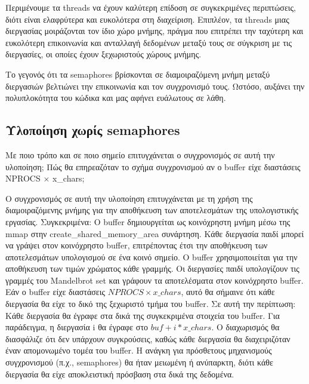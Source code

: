 \documentclass[12pt]{article}
\begin{document}
Περιμένουμε τα threads να έχουν καλύτερη επίδοση σε συγκεκριμένες περιπτώσεις, διότι
είναι ελαφρύτερα και ευκολότερα στη διαχείριση. Επιπλέον, τα threads μιας διεργασίας
μοιράζονται τον ίδιο χώρο μνήμης, πράγμα που επιτρέπει την ταχύτερη και ευκολότερη 
επικοινωνία και ανταλλαγή δεδομένων μεταξύ τους σε σύγκριση με τις διεργασίες, οι 
οποίες έχουν ξεχωριστούς χώρους μνήμης.

Το γεγονός ότι τα semaphores βρίσκονται σε διαμοιραζόμενη μνήμη μεταξύ διεργασιών 
βελτιώνει την επικοινωνία και τον συγχρονισμό τους. 
Ωστόσο, αυξάνει την πολυπλοκότητα του κώδικα και μας αφήνει ευάλωτους σε λάθη.


\subsection{Υλοποίηση χωρίς semaphores}

\begin{question}
Με ποιο τρόπο και σε ποιο σημείο επιτυγχάνεται ο συγχρονισμός σε αυτή την υλοποίηση; 
Πώς θα επηρεαζόταν το σχήμα συγχρονισμού αν ο buffer είχε διαστάσεις
NPROCS $\times$ x\_chars;
\end{question}

Ο συγχρονισμός σε αυτή την υλοποίηση επιτυγχάνεται με τη χρήση της διαμοιραζόμενης 
μνήμης για την αποθήκευση των αποτελεσμάτων της υπολογιστικής εργασίας. 
Συγκεκριμένα:
Ο buffer δημιουργείται ως κοινόχρηστη μνήμη μέσω της mmap στην 
create\_shared\_memory\_area συνάρτηση.
Κάθε διεργασία παιδί μπορεί να γράψει στον κοινόχρηστο buffer, επιτρέποντας έτσι 
την αποθήκευση των αποτελεσμάτων υπολογισμού σε ένα κοινό σημείο.
Ο buffer χρησιμοποιείται για την αποθήκευση των τιμών χρώματος κάθε γραμμής. 
Οι διεργασίες παιδί υπολογίζουν τις γραμμές του Mandelbrot set και γράφουν τα 
αποτελέσματα στον κοινόχρηστο buffer.
Εάν ο buffer είχε διαστάσεις ${NPROCS \times x\_chars}$, αυτό θα σήμαινε 
ότι κάθε διεργασία θα είχε το δικό της ξεχωριστό τμήμα του buffer. 
Σε αυτή την περίπτωση:
Κάθε διεργασία θα έγραφε στα δικά της συγκεκριμένα στοιχεία του buffer. 
Για παράδειγμα, η διεργασία i θα έγραφε στο ${buf + i * x\_chars}$.
Ο διαχωρισμός θα διασφάλιζε ότι δεν υπάρχουν συγκρούσεις, καθώς κάθε διεργασία θα 
διαχειριζόταν έναν απομονωμένο τομέα του buffer.
Η ανάγκη για πρόσθετους μηχανισμούς συγχρονισμού (π.χ., semaphores) θα ήταν μειωμένη 
ή ανύπαρκτη, διότι κάθε διεργασία θα είχε αποκλειστική πρόσβαση στα δικά της δεδομένα.
\end{document}
